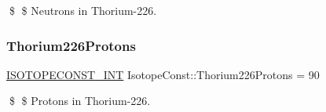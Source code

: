 \$ \$ Neutrons in Thorium-\/226. \mbox{\label{group___isotope_const-_thorium-_th226_ga827af59ad49431276ef4378ba49cb2a0}} 
\subsubsection{\texorpdfstring{Thorium226\+Protons}{Thorium226Protons}}
{\footnotesize\ttfamily \mbox{\hyperlink{group___isotope_const-_macros_ga5f18360b3e99483a35c32d789e62621c}{I\+S\+O\+T\+O\+P\+E\+C\+O\+N\+S\+T\+\_\+\+I\+NT}} Isotope\+Const\+::\+Thorium226\+Protons = 90}

\$ \$ Protons in Thorium-\/226. 